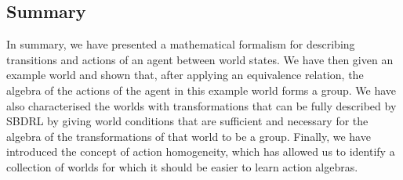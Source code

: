 \subsection{Summary}
In summary, we have presented a mathematical formalism for describing transitions and actions of an agent between world states.
We have then given an example world and shown that, after applying an equivalence relation, the algebra of the actions of the agent in this example world forms a group.
We have also characterised the worlds with transformations that can be fully described by SBDRL by giving world conditions that are sufficient and necessary for the algebra of the transformations of that world to be a group.
Finally, we have introduced the concept of action homogeneity, which has allowed us to identify a collection of worlds for which it should be easier to learn action algebras.
